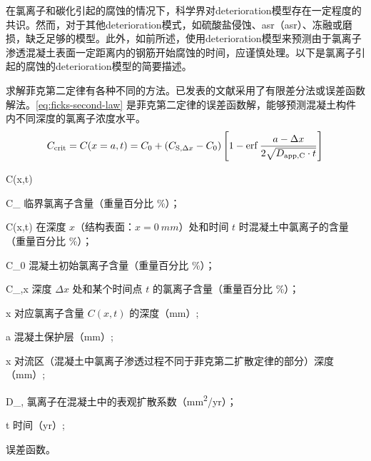 在氯离子和碳化引起的腐蚀的情况下，科学界对\gls*{deterioration}模型存在一定程度的共识。然而，对于其他\gls*{deterioration}模式，如硫酸盐侵蚀、\acrlong{asr}（\acrshort{asr}）、冻融或磨损，缺乏足够的模型。此外，如前所述，使用\gls*{deterioration}模型来预测由于氯离子渗透混凝土表面一定距离内的钢筋开始腐蚀的时间，应谨慎处理。以下是氯离子引起的腐蚀的\gls*{deterioration}模型的简要描述。


求解菲克第二定律有各种不同的方法。已发表的文献采用了有限差分法或误差函数解法。\cref{eq:ficks-second-law} 是菲克第二定律的误差函数解，能够预测混凝土构件内不同深度的氯离子浓度水平。
\begin{equation}
  \label{eq:ficks-second-law}
  C_\text{crit} = C(x=a, t) = C_0 +(C_{\text{S},\Delta x} - C_0)\left[ 1-\operatorname{erf} 
   \frac{a-\Delta x}{2\sqrt{D_{\text{app},\text{C}}\cdot t}} \right]
\end{equation}
\begin{EqDesc}{C(x,t)}
  \item[C_\text{crit}] 临界氯离子含量（重量百分比 \%）；
  \item[C(x,t)] 在深度 $x$（结构表面：$x=\qty{0}{mm}$）处和时间 $t$ 时混凝土中氯离子的含量（重量百分比 \%）；
  \item[C_0] 混凝土初始氯离子含量（重量百分比 \%）；
  \item[C_{\text{S},\Delta x}] 深度 $\Delta x$ 处和某个时间点 $t$ 的氯离子含量（重量百分比 \%）；
  \item[x] 对应氯离子含量 $C(x,t)$ 的深度（\unit{mm}）;
  \item[a] 混凝土保护层（\unit{mm}）;
  \item[\Delta x]对流区（混凝土中氯离子渗透过程不同于菲克第二扩散定律的部分）深度（\unit{mm}）;
  \item[D_{\text{app},\text{C}}] 氯离子在混凝土中的表观扩散系数（\unit{mm^2/yr}）；
  \item[t] 时间（\unit{yr}）;
  \item[\erf] 误差函数。
\end{EqDesc}


